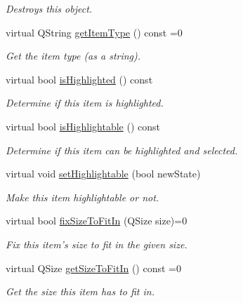 \begin{DoxyCompactItemize}
\begin{DoxyCompactList}\small\item\em Destroys this object. \end{DoxyCompactList}\item 
virtual Q\-String \hyperlink{class_u_i_1_1_item_widget_a83f42fd7ce38235e3fee565e32c4abbd}{get\-Item\-Type} () const =0
\begin{DoxyCompactList}\small\item\em Get the item type (as a string). \end{DoxyCompactList}\item 
virtual bool \hyperlink{class_u_i_1_1_item_widget_a7c9526280ee68bae95cda1edbd7cd983}{is\-Highlighted} () const 
\begin{DoxyCompactList}\small\item\em Determine if this item is highlighted. \end{DoxyCompactList}\item 
virtual bool \hyperlink{class_u_i_1_1_item_widget_a668415d03dbf1b185a71d94a703c2b1d}{is\-Highlightable} () const 
\begin{DoxyCompactList}\small\item\em Determine if this item can be highlighted and selected. \end{DoxyCompactList}\item 
virtual void \hyperlink{class_u_i_1_1_item_widget_a6f8d842077fd7fcfd2b9b351528d6624}{set\-Highlightable} (bool new\-State)
\begin{DoxyCompactList}\small\item\em Make this item highlightable or not. \end{DoxyCompactList}\item 
virtual bool \hyperlink{class_u_i_1_1_item_widget_ad90435198f488bac4217cf1caca622d9}{fix\-Size\-To\-Fit\-In} (Q\-Size size)=0
\begin{DoxyCompactList}\small\item\em Fix this item's size to fit in the given size. \end{DoxyCompactList}\item 
virtual Q\-Size \hyperlink{class_u_i_1_1_item_widget_a7f1653d1f9cb81cb2266c4a580a12d2b}{get\-Size\-To\-Fit\-In} () const =0
\begin{DoxyCompactList}\small\item\em Get the size this item has to fit in. \end{DoxyCompactList}\end{DoxyCompactItemize}
